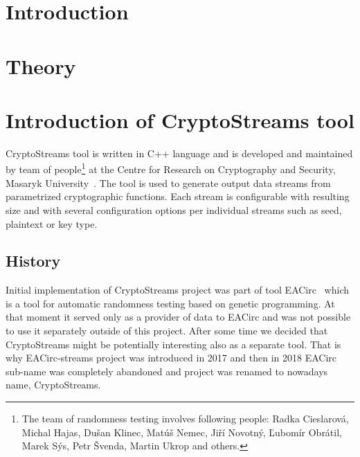 \documentclass[
    digital,    %
    oneside,    %
    color,
    11pt,
    nocover,
    notable,
    nolof,
    nolot,
    final
]{fithesis3}
\begin{document}
\setlength{\parskip}{5pt}
\setlength{\parindent}{0pt}


\chapter{Introduction}
\label{chap:introduction}


\chapter{Theory}

\chapter{Introduction of CryptoStreams tool}
\label{chap:cryptostreams}

CryptoStreams tool is written in C++ language and is developed and maintained by team of people\footnote{The team of randomness testing involves following people: Radka Cieslarová, Michal Hajas, Dušan Klinec, Matúš Nemec, Jiří Novotný, Ľubomír Obrátil, Marek Sýs, Petr Švenda, Martin Ukrop and others.} at the Centre for Research on Cryptography and Security, Masaryk University~\cite{CryptoStreams}. The tool is used to generate output data streams from parametrized cryptographic functions. Each stream is configurable with resulting size and with several configuration options per individual streams such as seed, plaintext or key type. 

\section{History}

Initial implementation of CryptoStreams project was part of tool EACirc~\cite{EACirc} which is a tool for automatic randomness testing based on genetic programming. At that moment it served only as a provider of data to EACirc and was not possible to use it separately outside of this project. After some time we decided that CryptoStreams might be potentially interesting also as a separate tool. That is why EACirc-streams project was introduced in 2017 and then in 2018 EACirc sub-name was completely abandoned and project was renamed to nowadays name, CryptoStreams.
\end{document}
